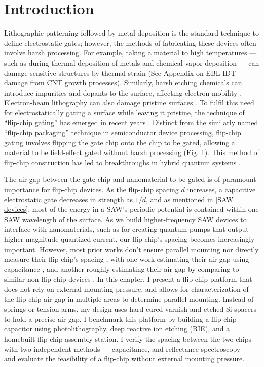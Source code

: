 \documentclass[double,12pt,1in]{beavtex}
\begin{document}
\section{Introduction}
Lithographic patterning followed by metal deposition is the standard technique to define electrostatic gates; however, the methods of fabricating these devices often involve harsh processing. For example, taking a material to high temperatures — such as during thermal deposition of metals and chemical vapor deposition — can damage sensitive structures by thermal strain (See Appendix on EBL IDT damage from CNT growth processes). Similarly, harsh etching chemicals can introduce impurities and dopants to the surface, affecting electron mobility \cite{beukman_noninvasive_2015}. Electron-beam lithography can also damage pristine surfaces \cite{fink_electron-beam-induced_1990}. To fulfil this need for electrostatically gating a surface while leaving it pristine, the technique of “flip-chip gating” has emerged in recent years \cite{beukman_noninvasive_2015,robertson_non-invasive_2020}. Distinct from the similarly named “flip-chip packaging” technique in semiconductor device processing, flip-chip gating involves flipping the gate chip onto the chip to be gated, allowing a material to be field-effect gated without harsh processing (Fig. 1). This method of flip-chip construction has led to breakthroughs in hybrid quantum systems \cite{chu_creation_2018,satzinger_quantum_2018}.

The air gap between the gate chip and nanomaterial to be gated is of paramount importance for flip-chip devices. As the flip-chip spacing $d$ increases, a capacitive electrostatic gate decreases in strength as $1/d$, and as mentioned in \ref{SAW devices}, most of the energy in a SAW's periodic potential is contained within one SAW wavelength of the surface. As we build higher-frequency SAW devices to interface with nanomaterials, such as for creating quantum pumps that output higher-magnitude quantized current, our flip-chip’s spacing becomes increasingly important. However, most prior works don’t ensure parallel mounting nor directly measure their flip-chip’s spacing \cite{chu_creation_2018,satzinger_quantum_2018,bennaceur_mechanical_2015}, with one work estimating their air gap using capacitance \cite{beukman_noninvasive_2015}, and another roughly estimating their air gap by comparing to similar non-flip-chip devices \cite{bennaceur_mechanical_2015}. In this chapter, I present a flip-chip platform that does not rely on external mounting pressure, and allows for characterization of the flip-chip air gap in multiple areas to determine parallel mounting. Instead of springs or tension arms, my design uses hard-cured varnish and etched Si spacers to hold a precise air gap. I benchmark this platform by building a flip-chip capacitor using photolithography, deep reactive ion etching (RIE), and a homebuilt flip-chip assembly station. I verify the spacing between the two chips with two independent methods — capacitance, and reflectance spectroscopy — and evaluate the feasibility of a flip-chip without external mounting pressure.
\end{document}

